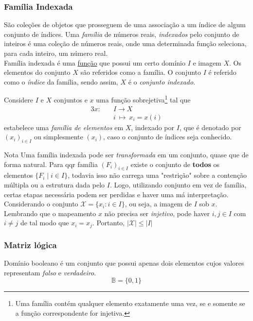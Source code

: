       \subsubsection{Família Indexada}
         São coleções de objetos que prosseguem de uma associação a um índice de algum conjunto de índices. Uma \emph{família} de números reais, \emph{indexados} pelo conjunto de inteiros é uma coleção de números reais, onde uma determinada função seleciona, para cada inteiro, um número real.\\
         Família indexada é uma \underline{função} que possui um certo domínio $\mathit{I}$ e imagem $X$.
         Os elementos do conjunto $X$ são referidos como a família.
         O conjunto $\mathit{I}$ é referido como o \emph{índice} da família, sendo assim, $X$ é o \emph{conjunto indexado}.
         \begin{definition}
            Considere $I$ e $X$ conjuntos e $x$ uma função sobrejetiva\footnote{Uma família contém qualquer elemento exatamente uma vez, se e somente se a função correspondente for injetiva.} tal que
            \begin{alignat*}{3}
               x:\quad &\mathit{I} \longrightarrow X\\
               &i\ \mapsto\ x_{i} = x(i)
            \end{alignat*}
            estabelece uma \emph{família de elementos} em $X$, indexado por $\mathit{I}$, que é denotado por $(x_{i})_{i \in \mathit{I}}$ ou simplesmente $(x_{i})$, caso o conjunto de índices seja conhecido.
         \end{definition}
         \begin{mymdframed}{Nota}
            Uma família indexada pode ser \emph{transformada} em um conjunto, quase que de forma natural. Para qqr família $(F_{i})_{i\in \mathit{I}}$ existe o conjunto de \textbf{todos} os elementos $\{F_{i} \mid i \in \mathit{I}\}$, todavia isso não carrega uma "restrição" sobre a contenção múltipla ou a estrutura dada pelo $I$. Logo, utilizando conjunto em vez de família, certas etapas necessária podem ser perdidas e haver uma má interpretação.
            Considerando o conjunto $\mathcal{X} = \{x_{i}: i\in \mathit{I}\}$, ou seja, a imagem de $I$ sob $x$. Lembrando que o mapeamento $x$ não precisa ser \emph{injetivo}, pode haver $i,j \in I$ com $i \neq j$ de tal modo que $x_{i} = x_{j}$. Portanto, $ | \mathcal{X} |  \leq | \mathit{I} | $  
         \end{mymdframed}

      \subsubsection{Matriz lógica}
         \begin{definition}
            Domínio booleano é um conjunto que possui apenas dois elementos cujos valores representam \emph{falso} e \emph{verdadeiro}.
            $$\mathbb{B} = \{0,1\}$$
         \end{definition}
      
